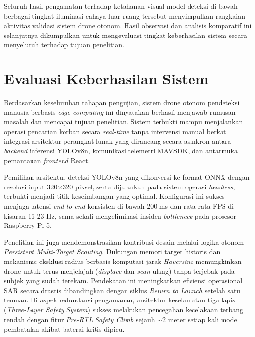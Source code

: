 Seluruh hasil pengamatan terhadap ketahanan visual model deteksi di bawah berbagai tingkat iluminasi cahaya luar ruang tersebut menyimpulkan rangkaian aktivitas validasi sistem drone otonom. Hasil observasi dan analisis komparatif ini selanjutnya dikumpulkan untuk mengevaluasi tingkat keberhasilan sistem secara menyeluruh terhadap tujuan penelitian.

\section{Evaluasi Keberhasilan Sistem}

Berdasarkan keseluruhan tahapan pengujian, sistem drone otonom pendeteksi manusia berbasis \textit{edge computing} ini dinyatakan berhasil menjawab rumusan masalah dan mencapai tujuan penelitian. Sistem terbukti mampu menjalankan operasi pencarian korban secara \textit{real-time} tanpa intervensi manual berkat integrasi arsitektur perangkat lunak yang dirancang secara asinkron antara \textit{backend} inferensi YOLOv8n, komunikasi telemetri MAVSDK, dan antarmuka pemantauan \textit{frontend} React.

Pemilihan arsitektur deteksi YOLOv8n yang dikonversi ke format ONNX dengan resolusi input 320$\times$320 piksel, serta dijalankan pada sistem operasi \textit{headless}, terbukti menjadi titik keseimbangan yang optimal. Konfigurasi ini sukses menjaga latensi \textit{end-to-end} konsisten di bawah 200 ms dan rata-rata FPS di kisaran 16-23 Hz, sama sekali mengeliminasi insiden \textit{bottleneck} pada prosesor Raspberry Pi 5.

Penelitian ini juga mendemonstrasikan kontribusi desain melalui logika otonom \textit{Persistent Multi-Target Scouting}. Dukungan memori target historis dan mekanisme eksklusi radius berbasis komputasi jarak \textit{Haversine} memungkinkan drone untuk terus menjelajah (\textit{displace} dan \textit{scan} ulang) tanpa terjebak pada subjek yang sudah terekam. Pendekatan ini meningkatkan efisiensi operasional SAR secara drastis dibandingkan dengan siklus \textit{Return to Launch} setelah satu temuan. Di aspek redundansi pengamanan, arsitektur keselamatan tiga lapis (\textit{Three-Layer Safety System}) sukses melakukan pencegahan kecelakaan terbang rendah dengan fitur \textit{Pre-RTL Safety Climb} sejauh $\sim$2 meter setiap kali mode pembatalan akibat baterai kritis dipicu.


